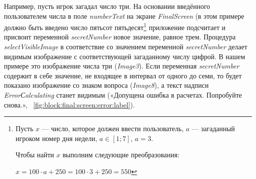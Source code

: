 Например, пусть игрок загадал число три. На основании введённого пользователем числа в поле \textit{numberText} на экране \textit{FinalScreen}
(в этом примере должно быть введено число пятьсот пятьдесят\footnote[][-0cm]{ Пусть $ x $ — число, которое должен ввести пользователь, $ a $ — загаданный игроком номер дня недели, $ a \in [1;7] $, $ a = 3 $. 

Чтобы найти $ x $ выполним следующие преобразования:

$ x = 100 \cdot a + 250  = 100 \cdot 3 + 250  = 550 $}\marginnote[0.2cm]{}
приложение подсчитает и присвоит переменной \textit{secretNumber} новое значение, равное трем.
Процедура \textit{selectVisibleImage} в соответствие со значением переменной \textit{secretNumber} делает видимым изображение с соответствующей загаданному числу цифрой. 
В нашем примере это изображение числа три (\textit{Image3}). Если переменная \textit{secretNumber} содержит в себе значение, не входящее в интервал от одного до семи, то будет показано изображение со знаком вопроса (\textit{Image8}), а текст надписи \textit{ErrorСalculating} станет видимым («Допущена ошибка в расчетах. Попробуйте снова.», ~\ref{fig:block:final:screen:error:label}).
